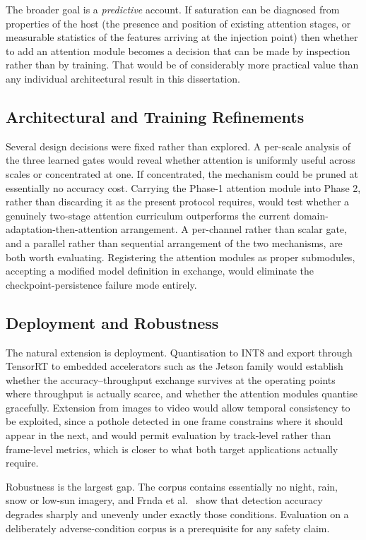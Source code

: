 \documentclass[MScCS]{uccthesis}
\begin{document}
The broader goal is a \emph{predictive} account. If saturation can be diagnosed
from properties of the host (the presence and position of existing attention
stages, or measurable statistics of the features arriving at the injection
point) then whether to add an attention module becomes a decision that can be
made by inspection rather than by training. That would be of considerably more
practical value than any individual architectural result in this dissertation.

\subsection{Architectural and Training Refinements}

Several design decisions were fixed rather than explored. A per-scale analysis
of the three learned gates would reveal whether attention is uniformly useful
across scales or concentrated at one. If concentrated, the mechanism could be
pruned at essentially no accuracy cost. Carrying the Phase-1 attention module
into Phase 2, rather than discarding it as the present protocol requires, would
test whether a genuinely two-stage attention curriculum outperforms the current
domain-adaptation-then-attention arrangement. A per-channel rather than scalar
gate, and a parallel rather than sequential arrangement of the two mechanisms,
are both worth evaluating. Registering the attention modules as proper
submodules, accepting a modified model definition in exchange, would
eliminate the checkpoint-persistence failure mode entirely.

\subsection{Deployment and Robustness}

The natural extension is deployment. Quantisation to INT8 and export through
TensorRT to embedded accelerators such as the Jetson family would establish
whether the accuracy--throughput exchange survives at the operating points where
throughput is actually scarce, and whether the attention modules quantise
gracefully. Extension from images to video would allow temporal consistency to
be exploited, since a pothole detected in one frame constrains where it should
appear in the next, and would permit evaluation by track-level rather than
frame-level metrics, which is closer to what both target applications
actually require.

Robustness is the largest gap. The corpus contains essentially no night, rain,
snow or low-sun imagery, and Frnda et al.~\parencite{frnda2024analysis} show
that detection accuracy degrades sharply and unevenly under exactly those
conditions. Evaluation on a deliberately adverse-condition corpus is a
prerequisite for any safety claim.
\end{document}
